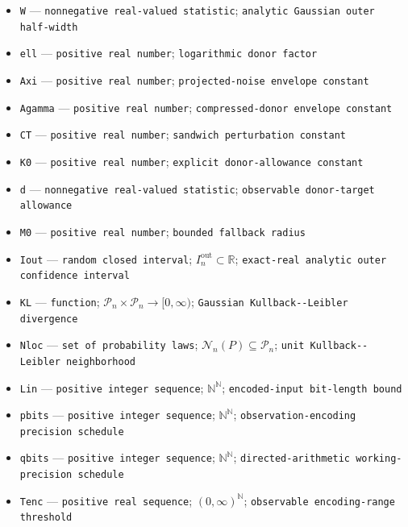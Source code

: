 \documentclass{article}
\begin{document}
\begin{itemize}
  \item \texttt{W} --- \texttt{nonnegative real-\allowbreak{}valued statistic}; \texttt{analytic Gaussian outer half-\allowbreak{}width}
  \item \texttt{ell} --- \texttt{positive real number}; \texttt{logarithmic donor factor}
  \item \texttt{Axi} --- \texttt{positive real number}; \texttt{projected-\allowbreak{}noise envelope constant}
  \item \texttt{Agamma} --- \texttt{positive real number}; \texttt{compressed-\allowbreak{}donor envelope constant}
  \item \texttt{CT} --- \texttt{positive real number}; \texttt{sandwich perturbation constant}
  \item \texttt{K0} --- \texttt{positive real number}; \texttt{explicit donor-\allowbreak{}allowance constant}
  \item \texttt{d} --- \texttt{nonnegative real-\allowbreak{}valued statistic}; \texttt{observable donor-\allowbreak{}target allowance}
  \item \texttt{M0} --- \texttt{positive real number}; \texttt{bounded fallback radius}
  \item \texttt{Iout} --- \texttt{random closed interval}; \(I_n^{\mathrm{out}}\subset\mathbb R\); \texttt{exact-\allowbreak{}real analytic outer confidence interval}
  \item \texttt{KL} --- \texttt{function}; \(\mathcal P_n\times\mathcal P_n\to[0,\infty)\); \texttt{Gaussian Kullback-\allowbreak{}-\allowbreak{}Leibler divergence}
  \item \texttt{Nloc} --- \texttt{set of probability laws}; \(\mathcal N_n(P)\subseteq\mathcal P_n\); \texttt{unit Kullback-\allowbreak{}-\allowbreak{}Leibler neighborhood}
  \item \texttt{Lin} --- \texttt{positive integer sequence}; \(\mathbb N^{\mathbb N}\); \texttt{encoded-\allowbreak{}input bit-\allowbreak{}length bound}
  \item \texttt{pbits} --- \texttt{positive integer sequence}; \(\mathbb N^{\mathbb N}\); \texttt{observation-\allowbreak{}encoding precision schedule}
  \item \texttt{qbits} --- \texttt{positive integer sequence}; \(\mathbb N^{\mathbb N}\); \texttt{directed-\allowbreak{}arithmetic working-\allowbreak{}precision schedule}
  \item \texttt{Tenc} --- \texttt{positive real sequence}; \((0,\infty)^{\mathbb N}\); \texttt{observable encoding-\allowbreak{}range threshold}

\end{itemize}
\end{document}
